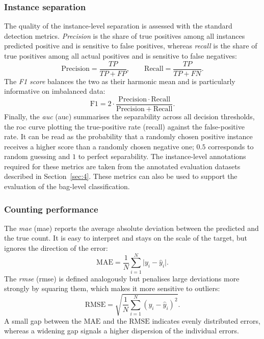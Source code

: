 \documentclass[12pt,parskip = half, DIV=classic,listof=totoc]{scrartcl}
\begin{document}
			\subsubsection*{Instance separation}
				The quality of the instance-level separation is assessed with the standard
				detection metrics. \emph{Precision} is the share of true positives among all
				instances predicted positive and is sensitive to false positives, whereas
				\emph{recall} is the share of true positives among all actual positives and is
				sensitive to false negatives:
				\begin{equation}
					\mathrm{Precision} = \frac{TP}{TP + FP}, \qquad
					\mathrm{Recall} = \frac{TP}{TP + FN} .
				\end{equation}
				The \emph{F1 score} balances the two as their harmonic mean and is particularly
				informative on imbalanced data:
				\begin{equation}
					\mathrm{F1} = 2 \cdot \frac{\mathrm{Precision}\cdot\mathrm{Recall}}{\mathrm{Precision} + \mathrm{Recall}} .
				\end{equation}
				Finally, the \emph{\acl{auc}} (\acs*{auc}) summarises the separability
				across all decision thresholds, the \ac{roc} curve plotting the true-positive rate
				(recall) against the false-positive rate. It can be read as the probability
				that a randomly chosen positive instance receives a higher score than a
				randomly chosen negative one; $0.5$ corresponds to random guessing and $1$ to
				perfect separability. The instance-level annotations required for these metrics are taken from the annotated
				evaluation datasets described in Section~\ref{sec:4}.
				These metrics can also be used to support the evaluation of the bag-level classification.

			\subsubsection*{Counting performance}
				The \emph{\acl{mae}} (\acs*{mae}) reports the average absolute deviation between
				the predicted and the true count. It is easy to interpret and stays on the
				scale of the target, but ignores the direction of the error:
				\begin{equation}
					\mathrm{MAE} = \frac{1}{N}\sum_{i=1}^{N}\lvert y_i - \hat{y}_i\rvert .
				\end{equation}
				The \emph{\acl{rmse}} (\acs*{rmse}) is defined analogously but penalises large
				deviations more strongly by squaring them, which makes it more sensitive to
				outliers:
				\begin{equation}
					\mathrm{RMSE} = \sqrt{\frac{1}{N}\sum_{i=1}^{N}(y_i - \hat{y}_i)^2} .
				\end{equation}
				A small gap between the $\mathrm{MAE}$ and the $\mathrm{RMSE}$ indicates evenly
				distributed errors, whereas a widening gap signals a higher dispersion of the
				individual errors.
\end{document}
